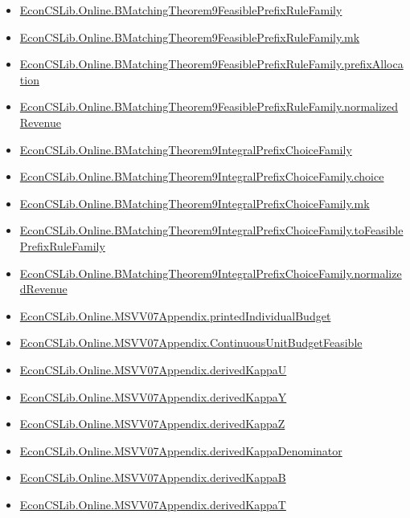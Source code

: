 \documentclass[10pt]{article}
\begin{document}
\begin{itemize}[leftmargin=1.2em]
\begin{itemize}[leftmargin=1.2em]
\item \hyperlink{library-prerequisite-ba3f8db9d6a57f6e}{EconCSLib.Online.BMatchingTheorem9FeasiblePrefixRuleFamily}
\item \hyperlink{library-prerequisite-c6e10cf9874314f2}{EconCSLib.Online.BMatchingTheorem9FeasiblePrefixRuleFamily.mk}
\item \hyperlink{library-prerequisite-01c7bedecc5eef4c}{EconCSLib.Online.BMatchingTheorem9FeasiblePrefixRuleFamily.prefixAllocation}
\item \hyperlink{library-prerequisite-81fa302ff4eed38a}{EconCSLib.Online.BMatchingTheorem9FeasiblePrefixRuleFamily.normalizedRevenue}
\item \hyperlink{library-prerequisite-bcf14d0dcc8b9cf2}{EconCSLib.Online.BMatchingTheorem9IntegralPrefixChoiceFamily}
\item \hyperlink{library-prerequisite-ecf9742db609398e}{EconCSLib.Online.BMatchingTheorem9IntegralPrefixChoiceFamily.choice}
\item \hyperlink{library-prerequisite-733e8b1d05ce2bb4}{EconCSLib.Online.BMatchingTheorem9IntegralPrefixChoiceFamily.mk}
\item \hyperlink{library-prerequisite-27f32ac8ec4d46de}{EconCSLib.Online.BMatchingTheorem9IntegralPrefixChoiceFamily.toFeasiblePrefixRuleFamily}
\item \hyperlink{library-prerequisite-62390ebaaf89b9aa}{EconCSLib.Online.BMatchingTheorem9IntegralPrefixChoiceFamily.normalizedRevenue}
\item \hyperlink{library-prerequisite-5207f29d522aa1f7}{EconCSLib.Online.MSVV07Appendix.printedIndividualBudget}
\item \hyperlink{library-prerequisite-9a1b5342e64d16d9}{EconCSLib.Online.MSVV07Appendix.ContinuousUnitBudgetFeasible}
\item \hyperlink{library-prerequisite-0841501e71cb1bde}{EconCSLib.Online.MSVV07Appendix.derivedKappaU}
\item \hyperlink{library-prerequisite-665b01852dc64984}{EconCSLib.Online.MSVV07Appendix.derivedKappaY}
\item \hyperlink{library-prerequisite-a13a11d6af8fbaa0}{EconCSLib.Online.MSVV07Appendix.derivedKappaZ}
\item \hyperlink{library-prerequisite-16fa55f5b8d28ef1}{EconCSLib.Online.MSVV07Appendix.derivedKappaDenominator}
\item \hyperlink{library-prerequisite-ec2e5ba942d1cbb0}{EconCSLib.Online.MSVV07Appendix.derivedKappaB}
\item \hyperlink{library-prerequisite-1d7ebf78040cf423}{EconCSLib.Online.MSVV07Appendix.derivedKappaT}

\end{itemize}
\end{itemize}
\end{document}
